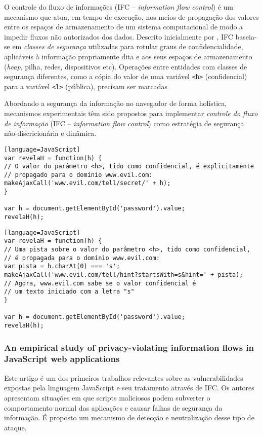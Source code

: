 O controle do fluxo de informações (IFC -- \textit{information flow control}) é um mecanismo que atua, em tempo de execução, nos meios de propagação dos valores entre os espaços de armazenamento de um sistema computacional de modo a impedir fluxos não autorizados dos dados. Descrito inicialmente por \cite{Denning1976}, IFC baseia-se em \textit{classes de segurança} utilizadas para rotular graus de confidencialidade, aplicáveis à informação propriamente dita e aos seus espaços de armazenamento (\textit{heap}, pilha, redes, dispositivos etc). Operações entre entidades com classes de segurança diferentes, como a cópia do valor de uma variável \texttt{<h>} (confidencial) para a variável \texttt{<l>} (pública), precisam ser marcadas 

Abordando a segurança da informação no navegador de forma holística, mecanismos experimentais têm sido propostos para implementar \textit{controle do fluxo de informação} (IFC -- \textit{information flow control}) como estratégia de segurança não-discricionária e dinâmica.

\begin{lstlisting}[caption=Fluxo explícito de informação][language=JavaScript]
var revelaH = function(h) {
// O valor do parâmetro <h>, tido como confidencial, é explicitamente
// propagado para o domínio www.evil.com:
makeAjaxCall('www.evil.com/tell/secret/' + h);
}

var h = document.getElementById('password').value;
revelaH(h);
\end{lstlisting}


\begin{lstlisting}[caption=Fluxo implícito de informação][language=JavaScript]
var revelaH = function(h) {
// Uma pista sobre o valor do parâmetro <h>, tido como confidencial,
// é propagada para o domínio www.evil.com:
var pista = h.charAt(0) === 's';
makeAjaxCall('www.evil.com/tell/hint?startsWith=s&hint=' + pista);
// Agora, www.evil.com sabe se o valor confidencial é
// um texto iniciado com a letra "s"
}

var h = document.getElementById('password').value;
revelaH(h);
\end{lstlisting}






\subsubsection{An empirical study of privacy-violating information flows in JavaScript web applications \cite{Jang2010}}
Este artigo é um dos primeiros trabalhos relevantes sobre as vulnerabilidades expostas pela linguagem JavaScript e seu tratamento através de IFC. Os autores apresentam situações em que scripts maliciosos podem subverter o comportamento normal das aplicações e causar falhas de segurança da informação. É proposto um mecanismo de detecção e neutralização desse tipo de ataque.

